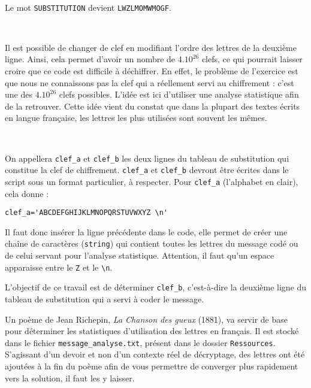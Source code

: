 ~\

Le mot \texttt{SUBSTITUTION} devient \texttt{LWZLMOMWMOGF}.

~\

Il est possible de changer de clef en modifiant l'ordre des lettres de la deuxième ligne. Ainsi, cela permet d'avoir un nombre de $4.10^{26}$ clefs, ce qui pourrait laisser croire que ce code est difficile à déchiffrer. En effet, le problème de l'exercice est que nous ne connaissons pas la clef qui a réellement servi au chiffrement : c'est une des $4.10^{26}$ clefs possibles. L'idée est ici d'utiliser une analyse statistique afin de la retrouver. Cette idée vient du constat que dans la plupart des textes écrits en langue française, les lettres les plus utilisées sont souvent les mêmes.

~\

On appellera \verb?clef_a? et \verb?clef_b? les deux lignes du tableau de substitution qui constitue la clef de chiffrement. \verb?clef_a? et \verb?clef_b? devront être écrites dans le script sous un format particulier, à respecter. Pour \verb?clef_a? (l'alphabet en clair), cela donne :
\begin{verbatim}
clef_a='ABCDEFGHIJKLMNOPQRSTUVWXYZ \n'
\end{verbatim}

Il faut donc insérer la ligne précédente dans le code, elle permet de créer une chaîne de caractères (\texttt{string}) qui contient toutes les lettres du message codé ou de celui servant pour l'analyse statistique. Attention, il faut qu'un espace apparaisse entre le \verb?Z? et le \verb?\n?.

L'objectif de ce travail est de déterminer \verb?clef_b?, c'est-à-dire la deuxième ligne du tableau de substitution qui a servi à coder le message.

Un poème de Jean Richepin, \textit{La Chanson des gueux} (1881), va servir de base pour déterminer les statistiques d'utilisation des lettres en français. Il est stocké dans le fichier \verb?message_analyse.txt?, présent dans le dossier \verb?Ressources?. S'agissant d'un devoir et non d'un contexte réel de décryptage, des lettres ont été ajoutées à la fin du poème afin de vous permettre de converger plus rapidement vers la solution, il faut les y laisser.

